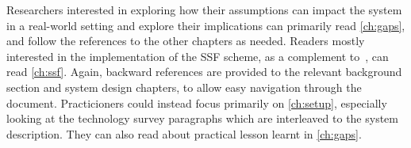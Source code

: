 Researchers interested in exploring how their assumptions 
can impact the system in a real-world setting and explore 
their implications can primarily read \cref{ch:gaps}, 
and follow the references to the other chapters as needed.
Readers mostly interested in the implementation of the SSF 
scheme, as a complement to~\cite{GKP}, 
can read \cref{ch:ssf}. 
Again, backward references are provided to the 
relevant background section and system design chapters,
to allow easy navigation through the document.
Practicioners could instead focus primarily on
\cref{ch:setup}, especially looking at the
technology survey paragraphs which are interleaved 
to the system description. 
They can also read about practical 
lesson learnt in \cref{ch:gaps}.
